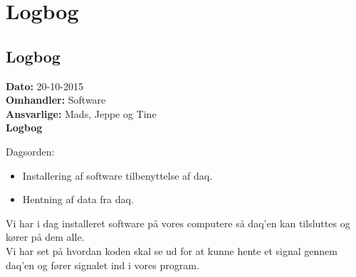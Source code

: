 \chapter{Logbog}
\section{Logbog}

\textbf{Dato:} 20-10-2015 \\
\textbf{Omhandler:} Software \\
\textbf{Ansvarlige:} Mads, Jeppe og Tine \\
\textbf{Logbog}

Dagsorden:
\begin{itemize}
	\item Installering af software tilbenyttelse af daq.
	\item Hentning af data fra daq. 
\end{itemize}

Vi har i dag installeret software på vores computere så daq'en kan tilsluttes og kører på dem alle.\\
Vi har set på hvordan koden skal se ud for at kunne hente et signal gennem daq'en og fører signalet ind i vores program.\\
   
